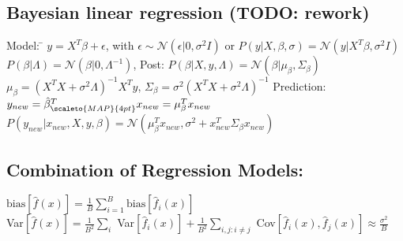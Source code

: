 \subsection*{Bayesian linear regression (TODO: rework)}
	Model:  \= $y = X^T \beta + \epsilon$, with $\epsilon \sim
	\mathcal{N}(\epsilon | 0, \sigma^2 I)$ or 
	\> $P(y | X, \beta, \sigma) = \mathcal{N}(y | X^T \beta , \sigma^2 I)$ 
	$P(\beta | \Lambda) = \mathcal{N} (\beta | 0, \Lambda^{-1})$, Post: $P(\beta | X, y, \Lambda) = \mathcal{N}(\beta | \mu_\beta, \Sigma_\beta)$ 
	$\mu_\beta = (X^T X + \sigma^2 \Lambda)^{-1} X^T y$, $\Sigma_\beta = \sigma^2(X^T X + \sigma^2 \Lambda)^{-1}$ 
	Prediction: \> $y_{new} = \hat{\beta}_{\scaleto{MAP}{4pt}}^T x_{new} = \mu_\beta ^T x_{new}$ 
	$P(y_{new} | x_{new}, X, y, \beta) 
	= \mathcal{N}(\mu_\beta ^T x_{new}, \sigma^2 + x_{new}^T \Sigma_\beta x_{new})$

\subsection*{Combination of Regression Models:}
$\text{bias}[\hat{f}(x)] = \frac{1}{B} \sum_{i=1}^{B} \text{bias}[\hat{f}_i(x)]$\\
Var$[\hat{f}(x)] = \frac{1}{B^2}\sum_i$ Var$[\hat{f}_i(x)]
+ \frac{1}{B^2}\sum_{i,j:i\neq j}$ Cov$[\hat{f}_i(x), \hat{f}_j(x)] \approx \frac{\sigma^2}{B}$



